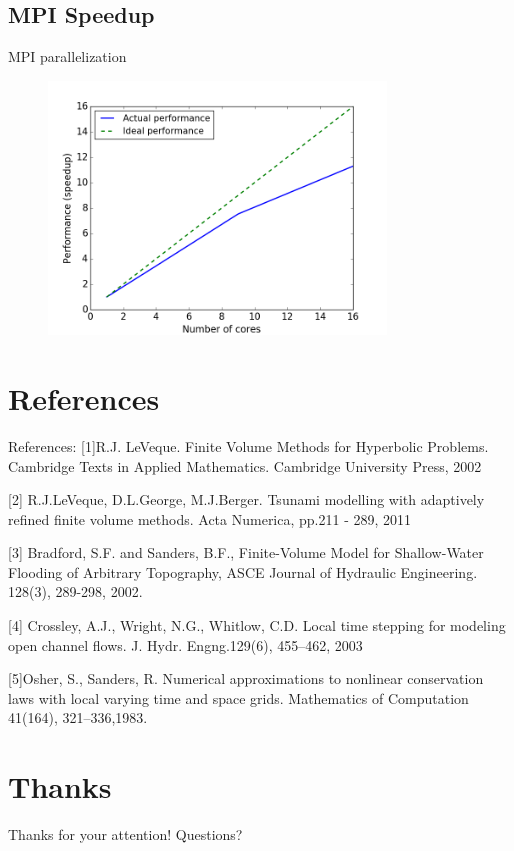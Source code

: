 \documentclass{beamer}
\begin{document}
\subsection{MPI Speedup}
\begin{frame}{MPI parallelization}
\begin{figure}[p]
    \centering
    \includegraphics[width=0.8\textwidth]{mpi_peformance}
    \label{fig:awesome_image}
\end{figure}
\end{frame}

\section[]{References}

\begin{frame}[t]{References:}
[1]R.J. LeVeque. Finite Volume Methods for Hyperbolic Problems. Cambridge Texts in Applied Mathematics. Cambridge University Press, 2002
    
[2] R.J.LeVeque, D.L.George, M.J.Berger. Tsunami modelling with adaptively refined finite volume methods. Acta Numerica, pp.211 - 289, 2011

[3] Bradford, S.F. and Sanders, B.F., Finite-Volume Model for Shallow-Water Flooding of Arbitrary Topography, ASCE Journal of Hydraulic Engineering. 128(3), 289-298, 2002.

[4] Crossley, A.J., Wright, N.G., Whitlow, C.D. Local time stepping for modeling open channel flows. J. Hydr. Engng.129(6), 455–462, 2003

[5]Osher, S., Sanders, R. Numerical approximations to nonlinear conservation laws with local varying time and space grids. Mathematics of Computation 41(164), 321–336,1983.
\end{frame}

\section*{Thanks}

\begin{frame}[t]{Thanks for your attention! Questions?}

\end{frame}
\end{document}
